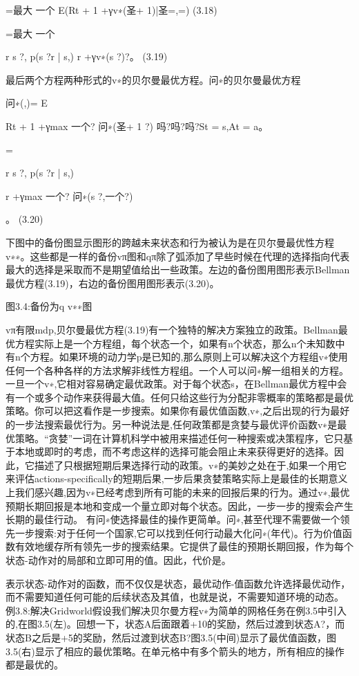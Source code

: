 =最大
一个
E(Rt + 1 +γv∗(圣+ 1)|圣=,=) 					(3.18)

=最大
一个

r s ?,
p(s ?r | s,) r +γv∗(s ?)?。 					(3.19)

最后两个方程两种形式的v∗的贝尔曼最优方程。问∗的贝尔曼最优方程

问∗(,)= E

Rt + 1 +γmax
一个?
问∗(圣+ 1 ?)
吗?吗?吗?St = s,At = a。

=

r s ?,
p(s ?r | s,)

r +γmax
一个?
问∗(s ?,一个?)

。 					(3.20)


下图中的备份图显示图形的跨越未来状态和行为被认为是在贝尔曼最优性方程v∗∗。这些都是一样的备份vπ图和qπ除了弧添加了早些时候在代理的选择指向代表最大的选择是采取而不是期望值给出一些政策。左边的备份图用图形表示Bellman最优方程(3.19)，右边的备份图用图形表示(3.20)。


图3.4:备份为q v∗∗图


vπ有限mdp,贝尔曼最优方程(3.19)有一个独特的解决方案独立的政策。Bellman最优方程实际上是一个方程组，每个状态一个，如果有n个状态，那么n个未知数中有n个方程。如果环境的动力学p是已知的,那么原则上可以解决这个方程组v∗使用任何一个各种各样的方法求解非线性方程组。一个人可以问∗解一组相关的方程。
一旦一个v∗,它相对容易确定最优政策。对于每个状态s，在Bellman最优方程中会有一个或多个动作来获得最大值。任何只给这些行为分配非零概率的策略都是最优策略。你可以把这看作是一步搜索。如果你有最优值函数,v∗,之后出现的行为最好的一步法搜索最优行为。另一种说法是,任何政策都是贪婪与最优评价函数v∗是最优策略。“贪婪”一词在计算机科学中被用来描述任何一种搜索或决策程序，它只基于本地或即时的考虑，而不考虑这样的选择可能会阻止未来获得更好的选择。因此，它描述了只根据短期后果选择行动的政策。v∗的美妙之处在于,如果一个用它来评估actions-specifically的短期后果,一步后果贪婪策略实际上是最佳的长期意义上我们感兴趣,因为v∗已经考虑到所有可能的未来的回报后果的行为。通过v∗,最优预期长期回报是本地和变成一个量立即对每个状态。因此，一步一步的搜索会产生长期的最佳行动。
有问∗使选择最佳的操作更简单。问∗,甚至代理不需要做一个领先一步搜索:对于任何一个国家,它可以找到任何行动最大化问∗(年代)。行为价值函数有效地缓存所有领先一步的搜索结果。它提供了最佳的预期长期回报，作为每个状态-动作对的局部和立即可用的值。因此，代价是。

表示状态-动作对的函数，而不仅仅是状态，最优动作-值函数允许选择最优动作，而不需要知道任何可能的后续状态及其值，也就是说，不需要知道环境的动态。
例3.8:解决Gridworld假设我们解决贝尔曼方程v∗为简单的网格任务在例3.5中引入的,在图3.5(左)。回想一下，状态A后面跟着+10的奖励，然后过渡到状态A?，而状态B之后是+5的奖励，然后过渡到状态B?图3.5(中间)显示了最优值函数，图3.5(右)显示了相应的最优策略。在单元格中有多个箭头的地方，所有相应的操作都是最优的。


